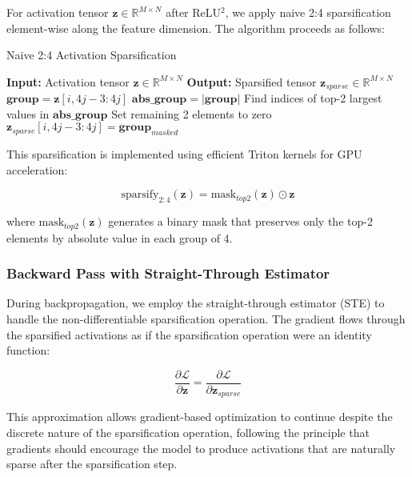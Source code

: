 For activation tensor $\mathbf{z} \in \mathbb{R}^{M \times N}$ after ReLU$^2$, we apply naive 2:4 sparsification element-wise along the feature dimension. The algorithm proceeds as follows:

\begin{algorithm}[H]
\caption{Naive 2:4 Activation Sparsification}
\begin{algorithmic}[1]
\STATE \textbf{Input:} Activation tensor $\mathbf{z} \in \mathbb{R}^{M \times N}$
\STATE \textbf{Output:} Sparsified tensor $\mathbf{z}_{sparse} \in \mathbb{R}^{M \times N}$
        \STATE $\mathbf{group} = \mathbf{z}[i, 4j-3:4j]$ 
        \STATE $\mathbf{abs\_group} = |\mathbf{group}|$ 
        \STATE Find indices of top-2 largest values in $\mathbf{abs\_group}$
        \STATE Set remaining 2 elements to zero
        \STATE $\mathbf{z}_{sparse}[i, 4j-3:4j] = \mathbf{group}_{masked}$
    \ENDFOR
\ENDFOR
\end{algorithmic}
\end{algorithm}

This sparsification is implemented using efficient Triton kernels for GPU acceleration:

\begin{equation}
\text{sparsify}_{2:4}(\mathbf{z}) = \text{mask}_{top2}(\mathbf{z}) \odot \mathbf{z}
\end{equation}

where $\text{mask}_{top2}(\mathbf{z})$ generates a binary mask that preserves only the top-2 elements by absolute value in each group of 4.

\subsubsection{Backward Pass with Straight-Through Estimator}

During backpropagation, we employ the straight-through estimator (STE) to handle the non-differentiable sparsification operation. The gradient flows through the sparsified activations as if the sparsification operation were an identity function:

\begin{equation}
\frac{\partial \mathcal{L}}{\partial \mathbf{z}} = \frac{\partial \mathcal{L}}{\partial \mathbf{z}_{sparse}}
\end{equation}

This approximation allows gradient-based optimization to continue despite the discrete nature of the sparsification operation, following the principle that gradients should encourage the model to produce activations that are naturally sparse after the sparsification step.

